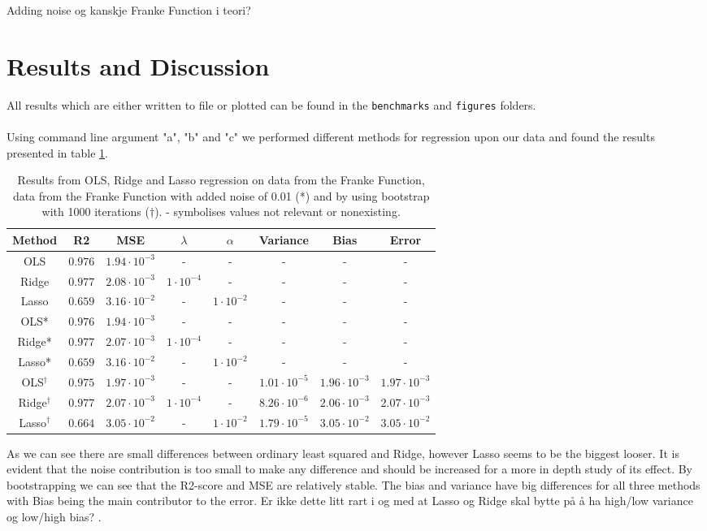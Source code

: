 \documentclass[12pt]{article}
\newcommand{\E}[1]{\cdot 10^{#1}}
\newcommand{\husk}[1]{\color{red} #1 \color{black}}
\begin{document}
\husk{Adding noise og kanskje Franke Function i teori?}
\section{Results and Discussion}  \label{s:rd}
All results which are either written to file or plotted can be found in the \texttt{benchmarks} and \texttt{figures} folders. \\ \\
Using command line argument "a", "b" and "c" we performed different methods for regression upon our data and found the results presented in table \ref{tabR:abc}.
\begin{table}[H]
\centering
\begin{tabular}{c|c|c|c|c|c|c|c}
Method & R2 & MSE & $\lambda$ & $\alpha$ & Variance & Bias & Error \\ \hline
OLS & $0.976$ & $1.94\E{-3}$ & - & - & - & - & - \\ \hline
Ridge & $0.977$ & $2.08\E{-3}$ & $1\E{-4}$ & - & - & - & - \\ \hline
Lasso &  $0.659$ & $3.16\E{-2}$ & - & $1\E{-2}$ & - & - & - \\ \hline
OLS* & $0.976$ & $1.94\E{-3}$ & - & - & - & - & - \\ \hline
Ridge* & $0.977$ & $2.07\E{-3}$ & $1\E{-4}$ & - & - & - & - \\ \hline
Lasso* &$0.659$ & $3.16\E{-2}$ & - & $1\E{-2}$ & - & - & -  \\ \hline
OLS$^{\dagger}$ & $0.975$ & $1.97\E{-3}$ & - & - & $1.01\E{-5}$ & $1.96\E{-3}$ & $1.97\E{-3}$ \\ \hline
Ridge$^{\dagger}$ & $0.977$ & $2.07\E{-3}$ & $1\E{-4}$ & - & $8.26\E{-6}$ & $2.06\E{-3}$ & $2.07\E{-3}$ \\ \hline
Lasso$^{\dagger}$ & $0.664$ & $3.05\E{-2}$ & - & $1\E{-2}$ & $1.79\E{-5}$ & $3.05\E{-2}$ & $3.05\E{-2}$  \\ \hline
\end{tabular}
\caption{Results from OLS, Ridge and Lasso regression on data from the Franke Function, data from the Franke Function with added noise of 0.01 (*) and by using bootstrap with 1000 iterations ($\dagger$). - symbolises values not relevant or nonexisting.}
\label{tabR:abc}
\end{table}
As we can see there are small differences between ordinary least squared and Ridge, however Lasso seems to be the biggest looser. It is evident that the noise contribution is too small to make any difference and should be increased for a more in depth study of its effect. By bootstrapping we can see that the R2-score and MSE are relatively stable. The bias and variance have big differences for all three methods with Bias being the main contributor to the error. \husk{Er ikke dette litt rart i og med at Lasso og Ridge skal bytte på å ha high/low variance og low/high bias?}. \\ \\
\end{document}
